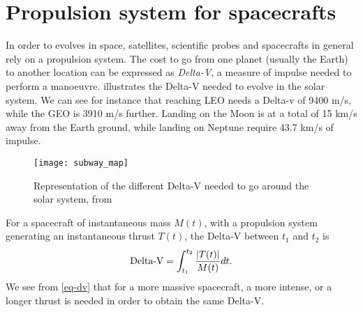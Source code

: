 


\section*{Propulsion system for spacecrafts}
\label{sec-propulsion}


In order to evolves in space, satellites, scientific probes and spacecrafts in general rely on a propulsion system.
The cost to go from one planet (usually the Earth) to another location can be expressed as \emph{ Delta-V}, a measure of impulse needed to perform a manoeuvre.
 illustrates the Delta-V needed to evolve in the solar system.
We can see for instance that reaching \ac{LEO} needs a Delta-v of 9400 m/s, while the \ac{GEO} is 3910 m/s further.
Landing on the Moon is at a total of 15 km/s away from the Earth ground, while landing on Neptune require 43.7 km/s of impulse.
\begin{figure}[hbtp]
  \centering
  \texttt{[image: subway\_map]}
  \caption{Representation of the different Delta-V needed to go around the solar system, from \citet{reddit-subway}}
  \label{fig-subway_DV}
\end{figure}


For a spacecraft of instantaneous mass $M(t)$, with a propulsion system generating an instantaneous thrust $T(t)$, the Delta-V between $t_1$ and $t_2$ is
\begin{equation} \label{eq-dv}
  \text{Delta-V} = \int_{t_1}^{t_2} \frac{ \lvert T(t)\rvert}{M(t)} dt.
\end{equation}
We see from \cref{eq-dv} that for a more massive spacecraft, a more intense, or a longer thrust is needed in order to obtain the same Delta-V.

